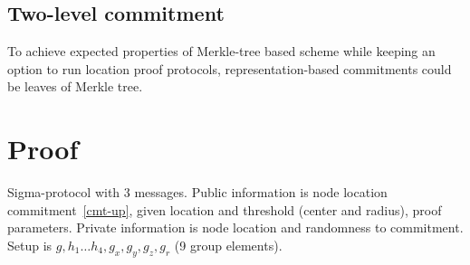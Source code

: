 \documentclass[a4paper,12pt]{article}
\begin{document}
\subsection{Two-level commitment}
To achieve expected properties of Merkle-tree based scheme while keeping an option
to run location proof protocols,
representation-based commitments could be leaves of Merkle tree.

\section{Proof}
\label{sect-close}
Sigma-protocol with 3 messages.
Public information is node location commitment~\eqref{cmt-up}, given location and threshold (center and radius), proof parameters.
Private information is node location and randomness to commitment.
Setup is $g, h_1 \dots h_4, g_x, g_y, g_z, g_r$
(9 group elements).
\end{document}
